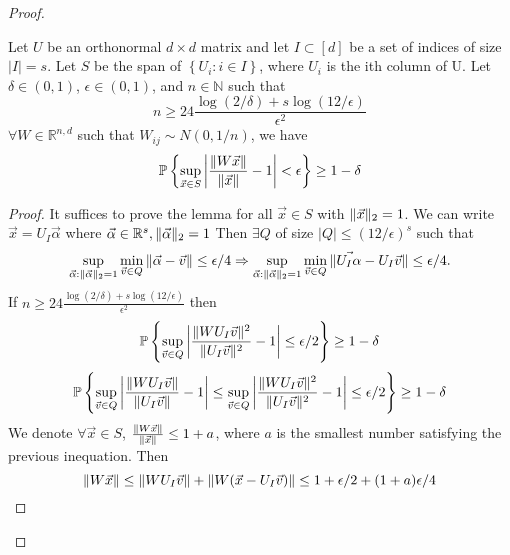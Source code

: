 \begin{theorem}
\begin{proof}
        \begin{lemma}
            Let $ U $ be an orthonormal $ d\times d $ matrix and let $ I \subset [d] $ be a set of indices of size $ \left| I \right| =  s$. Let $ S $ be the span of $ \left\{ U_i : i \in I \right\} $, where $ U_i $ is the ith column of U. Let $ \delta \in (0,1) $, $ \epsilon \in (0,1) $, and $ n\in\mathbb{N} $ such that 
            \[
                n \ge 24 \frac{\log(2/\delta) + s \log(12/\epsilon)}{\epsilon^2} 
            \]
            $ \forall W \in \mathbb{R}^{n,d} $ such that $ W_{ij} \sim N(0, 1/n) $, we have
            \[
                \mathbb{P}\left\{ \sup_{\vec{x} \in S} \left| \frac{ \Arrowvert W \vec{x} \Arrowvert}{ \Arrowvert \vec{x} \Arrowvert} - 1  \right| < \epsilon \right\} \ge 1-\delta
            \]
            \begin{proof}
                It suffices to prove the lemma for all $ \vec{x} \in S $ with $ \Arrowvert \vec{x} \Arrowvert_2 = 1 $. We can write $ \vec{x} = U_I \vec{\alpha} $ where $ \vec{\alpha} \in \mathbb{R}^{s}, \Arrowvert \vec{\alpha} \Arrowvert_2 = 1 $
                Then $ \exists Q $ of size $ \left| Q \right| \le {(12/\epsilon)}^{s} $ such that
                \[
                    \sup_{\vec{\alpha}: \Arrowvert \vec{\alpha} \Arrowvert_2 = 1}\min_{\vec{v} \in Q} \Arrowvert \vec{\alpha} - \vec{v} \Arrowvert \le \epsilon/4 \Rightarrow
                    \sup_{\vec{\alpha}: \Arrowvert \vec{\alpha} \Arrowvert_2 = 1}\min_{\vec{v} \in Q} \Arrowvert \vec{U_I \alpha} - U_I \vec{v} \Arrowvert \le \epsilon/4.
                \]
                If $ n \ge 24 \frac{\log(2/\delta) + s \log(12/\epsilon)}{\epsilon^2}  $ then 
                \[
                    \mathbb{P} \left\{ \sup_{\vec{v} \in Q} \left| \frac{ \Arrowvert W U_I \vec{v} \Arrowvert^2}{ \Arrowvert U_I \vec{v} \Arrowvert^2} - 1  \right| \le \epsilon/2 \right\} \ge 1 - \delta
                \]
                \[
                    \mathbb{P} \left\{ \sup_{\vec{v} \in Q} \left| \frac{ \Arrowvert W U_I \vec{v} \Arrowvert}{ \Arrowvert U_I \vec{v} \Arrowvert} - 1  \right| \le \sup_{\vec{v} \in Q} \left| \frac{ \Arrowvert W U_I \vec{v} \Arrowvert^2}{ \Arrowvert U_I \vec{v} \Arrowvert^2} - 1  \right| \le \epsilon/2 \right\} \ge 1 - \delta
                \]
                We denote $ \forall \vec{x} \in S $, $ \frac{ \Arrowvert W \vec{x} \Arrowvert}{ \Arrowvert \vec{x} \Arrowvert} \le 1 + a  $, where $ a $ is the smallest number satisfying the previous inequation.
                Then
                \[
                    \Arrowvert W \vec{x} \Arrowvert \le \Arrowvert W U_I \vec{v} \Arrowvert + \Arrowvert W (\vec{x} - U_I \vec{v}) \Arrowvert \le 1 + \epsilon/2 + (1+a) \epsilon/4
\]
\end{proof}
\end{lemma}
\end{proof}
\end{theorem}
